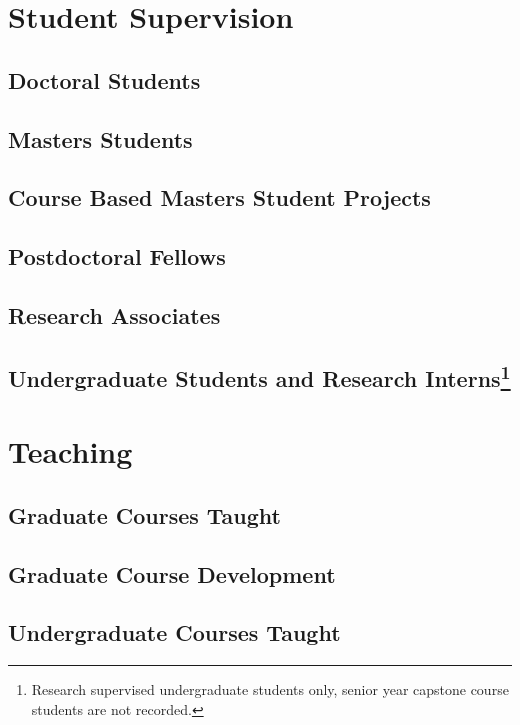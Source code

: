 \documentclass[letter,10pt]{article}
\begin{document}
\section{Student Supervision}

\subsection{Doctoral Students}


\subsection{Masters Students}


\subsection{Course Based Masters Student Projects}

\subsection{Postdoctoral Fellows}

\subsection{Research Associates}

\subsection[Undergraduate Students and Research Interns]{Undergraduate Students and Research Interns\protect\footnote{Research supervised undergraduate students only, senior year capstone course students are not recorded.}}


\section{Teaching}
\subsection{Graduate Courses Taught}

\subsection{Graduate Course Development}

\subsection{Undergraduate Courses Taught}

\end{document}
